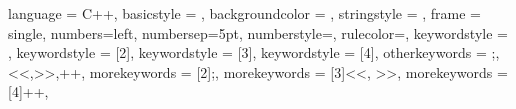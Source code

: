 {
	language = C++,
	basicstyle = {\ttfamily \color{main-color}},
	backgroundcolor = {\color{back-color}},
	stringstyle = {\color{string-color}},
	frame = single,
	numbers=left,
	numbersep=5pt,
	numberstyle=\tiny\color{black},
	rulecolor=\color{black},
	keywordstyle = {\color{key-color}},
	keywordstyle = [2]{\color{lime}},
	keywordstyle = [3]{\color{yellow}},
	keywordstyle = [4]{\color{teal}},
	otherkeywords = {;,<<,>>,++},
	morekeywords = [2]{;},
	morekeywords = [3]{<<, >>},
	morekeywords = [4]{++},
}

\let\Chaptermark\chaptermark
\def\chaptermark#1{\def\Chaptername{#1}\Chaptermark{#1}}
\let\Sectionmark\sectionmark
\def\sectionmark#1{\def\Sectionname{#1}\Sectionmark{#1}}
\let\Subsectionmark\subsectionmark
\def\subsectionmark#1{\def\Subsectionname{#1}\Subsectionmark{#1}}
\let\Subsubsectionmark\subsubsectionmark
\def\subsubsectionmark#1{\def\Subsubsectionname{#1}\Subsubsectionmark{#1}}
\setcounter{simul}{1}

